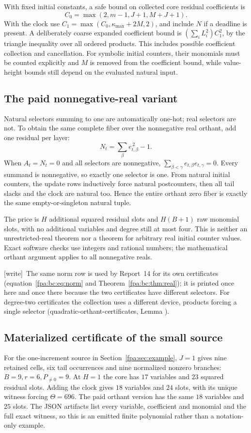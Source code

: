 \documentclass[11pt,a4paper]{article}
\numberwithin{equation}{section}
\newcommand{\wtag}{\textup{[write]}}
\begin{document}
With fixed initial constants, a safe bound on collected core residual
coefficients is
\[
 C_0=\max(2,m-1,J+1,M+J+1).
\]
With the clock use $C_1=\max(C_0,\kappa_{\max}+2M,2)$, and include $N$ if a
deadline is present. A deliberately coarse expanded coefficient bound is
$(\sum_iL_i^2)C_1^2$, by the triangle inequality over all ordered products.
This includes possible coefficient collection and cancellation. For symbolic
initial counters, their monomials must be counted explicitly and $M$ is
removed from the coefficient bound, while value-height bounds still depend
on the evaluated natural input.

\subsection{The paid nonnegative-real variant}
Natural selectors summing to one are automatically one-hot; real selectors
are not. To obtain the same complete fiber over the nonnegative real orthant,
add one residual per layer:
\[
                 N_t=\sum_\beta e_{t,\beta}^{\,2}-1.                \tag{33}
\]
When $A_t=N_t=0$ and all selectors are nonnegative,
$\sum_{\beta<\gamma}e_{t,\beta}e_{t,\gamma}=0$. Every summand is nonnegative,
so exactly one selector is one. From natural initial counters, the update
rows inductively force natural postcounters, then all tail slacks and the
clock are natural too. Hence the entire orthant zero fiber is exactly the
same empty-or-singleton natural tuple.

The price is $H$ additional squared residual slots and $H(B+1)$ raw monomial
slots, with no additional variables and degree still at most four. This is
neither an unrestricted-real theorem nor a theorem for arbitrary real initial
counter values. Exact software checks use integers and rational numbers;
the mathematical orthant argument applies to all nonnegative reals.

\wtag\ The same norm row is used by Report~14 for its own certificates (equation~\eqref{fpa:bc:eq:norm} and Theorem~\ref{fpa:bc:thm:real}); it is printed once here and once there because the two certificates have different selectors. For degree-two certificates the collection uses a different device, products forcing a single selector (quadratic-orthant-certificates, Lemma ).

\subsection{Materialized certificate of the small source}
For the one-increment source in Section~\ref{fpa:sec:example}, $J=1$ gives nine
retained cells, six tail occurrences and nine normalized nonzero branches:
$B=9,r=6,P_{\ne0}=9$. At $H=1$ the core has $17$ variables and $23$ squared
residual slots. Adding the clock gives $18$ variables and $24$ slots, with its
unique witness forcing $\Theta=696$. The paid orthant version has the same
$18$ variables and $25$ slots. The JSON artifacts list every variable,
coefficient and monomial and the full exact witness, so this is an emitted
finite polynomial rather than a notation-only example.
\end{document}

